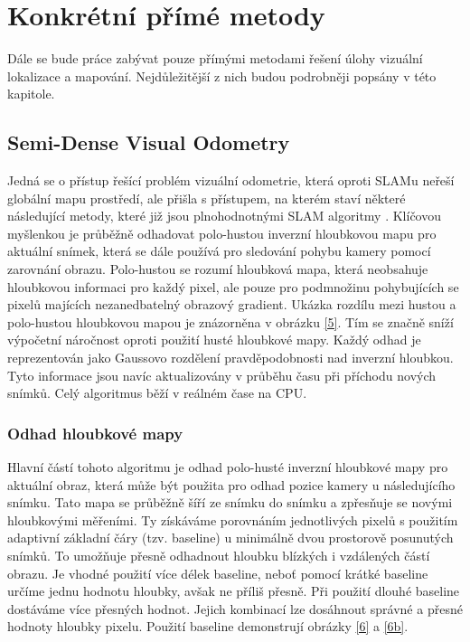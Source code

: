 \documentclass[12pt,a4paper]{report}
\begin{document}
\chapter{Konkrétní přímé metody}
Dále se bude práce zabývat pouze přímými metodami řešení úlohy vizuální lokalizace a mapování. Nejdůležitější z nich budou podrobněji popsány v této kapitole.

\section{Semi-Dense Visual Odometry}
Jedná se o přístup řešící problém vizuální odometrie, která oproti SLAMu neřeší globální mapu prostředí, ale přišla s přístupem, na kterém staví některé následující metody, které již jsou plnohodnotnými SLAM algoritmy \cite{Semi-Dense_VO}. Klíčovou myšlenkou je průběžně odhadovat polo-hustou inverzní hloubkovou mapu pro aktuální snímek, která se dále používá pro sledování pohybu kamery pomocí zarovnání obrazu. Polo-hustou se rozumí hloubková mapa, která neobsahuje hloubkovou informaci pro každý pixel, ale pouze pro podmnožinu pohybujících se pixelů majících nezanedbatelný obrazový gradient. Ukázka rozdílu mezi hustou a polo-hustou hloubkovou mapou je znázorněna v obrázku \ref{5}. Tím se značně sníží výpočetní náročnost oproti použití husté hloubkové mapy. Každý odhad je reprezentován jako Gaussovo rozdělení pravděpodobnosti nad inverzní hloubkou. Tyto informace jsou navíc aktualizovány v průběhu času při příchodu nových snímků. Celý algoritmus běží v reálném čase na CPU.

\subsection*{Odhad hloubkové mapy}
Hlavní částí tohoto algoritmu je odhad polo-husté inverzní hloubkové mapy pro aktuální obraz, která může být použita pro odhad pozice kamery u následujícího snímku. Tato mapa se průběžně šíří ze snímku do snímku a zpřesňuje se novými hloubkovými měřeními. Ty získáváme porovnáním jednotlivých pixelů s použitím adaptivní základní čáry (tzv. baseline) u minimálně dvou prostorově posunutých snímků. To umožňuje přesně odhadnout hloubku blízkých i vzdálených částí obrazu. Je vhodné použití více délek baseline, neboť pomocí krátké baseline určíme jednu hodnotu hloubky, avšak ne příliš přesně. Při použití dlouhé baseline dostáváme více přesných hodnot. Jejich kombinací lze dosáhnout správné a přesné hodnoty hloubky pixelu. Použití baseline demonstrují obrázky \ref{6} a \ref{6b}.
\end{document}
